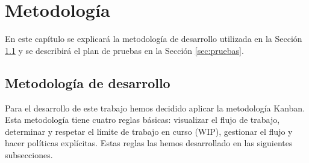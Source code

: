 \chapter{Metodología}
\label{cap:metodologia}
En este capítulo se explicará la metodología de desarrollo utilizada en la Sección \ref{cap:Kanban} y se describirá el plan de pruebas en la Sección \ref{sec:pruebas}.
\section{Metodología de desarrollo}
\label{cap:Kanban}
Para el desarrollo de este trabajo hemos decidido aplicar la metodología Kanban. Esta metodología tiene cuatro reglas básicas: visualizar el flujo de trabajo, determinar y respetar el límite de trabajo en curso (WIP), gestionar el flujo y hacer políticas explícitas. Estas reglas las hemos desarrollado en las siguientes subsecciones.

